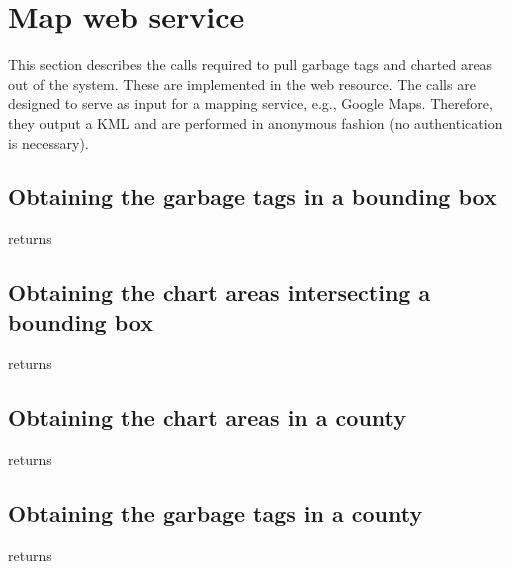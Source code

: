 \section{Map web service}
\label{sec:call:map}

This section describes the calls required to pull garbage tags and charted areas
out of the system. These are implemented in the
 web resource. The
calls are designed to serve as input for a mapping service, e.g., Google Maps.
Therefore, they output a KML and are performed in anonymous fashion (no
authentication is necessary).

\subsection{Obtaining the garbage tags in a bounding box}

\begin{apidata}{returns}
  \begin{datalist}
  \end{datalist}
\end{apidata}

\subsection{Obtaining the chart areas intersecting a bounding box}

\begin{apidata}{returns}
  \begin{datalist}
  \end{datalist}
\end{apidata}

\subsection{Obtaining the chart areas in a county}

\begin{apidata}{returns}
  \begin{datalist}
  \end{datalist}
\end{apidata}

\subsection{Obtaining the garbage tags in a county}
\begin{apidata}{returns}
  \begin{datalist}
  \end{datalist}
\end{apidata}


